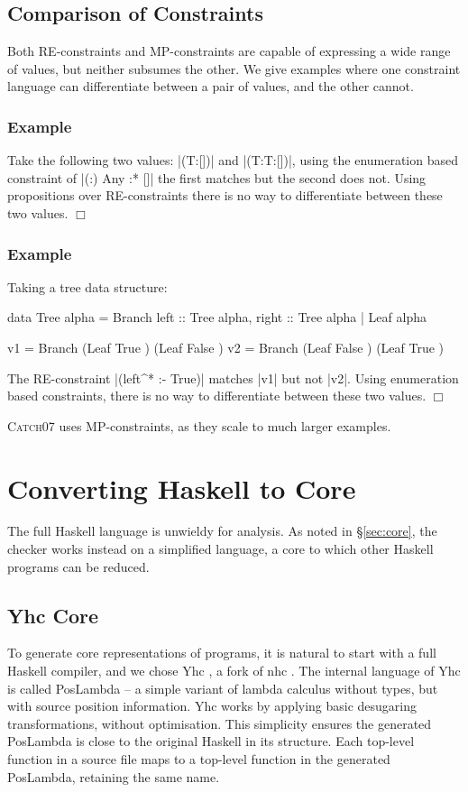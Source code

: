 \documentclass[preprint]{sigplanconf}
\newcommand{\catch}{\textsc{Catch}}
\newcounter{exmp}
\newcommand{\yesexample}{\subsubsection*{Example \arabic{exmp}}\addtocounter{exmp}{1}}
\newcommand{\noexample}{\hfill$\Box$}
\newenvironment{example}{\yesexample}{\noexample}
\begin{document}
\subsection{Comparison of Constraints}

Both RE-constraints and MP-constraints are capable of expressing a wide range of values, but neither subsumes the other. We give examples where one constraint language can differentiate between a pair of values, and the other cannot.

\begin{example}
Take the following two values: |(T:[])| and |(T:T:[])|, using the enumeration based constraint of |{(:) Any} :* {[]}| the first matches but the second does not. Using propositions over RE-constraints there is no way to differentiate between these two values.
\end{example}

\begin{example}
Taking a tree data structure:

\begin{code}
data Tree alpha  =  Branch {left :: Tree alpha, right :: Tree alpha}
                 |  Leaf alpha

v1 = Branch (Leaf True   ) (Leaf False  )
v2 = Branch (Leaf False  ) (Leaf True   )
\end{code}

The RE-constraint |(left^* :- True)| matches |v1| but not |v2|. Using enumeration based constraints, there is no way to differentiate between these two values.
\end{example}

\catch07 uses MP-constraints, as they scale to much larger examples.

\section{Converting Haskell to Core}
\label{sec:transform}

The full Haskell language is unwieldy for analysis. As noted in \S\ref{sec:core}, the checker works instead on a simplified language, a core to which other Haskell programs can be reduced.

\subsection{Yhc Core}

To generate core representations of programs, it is natural to start with a full Haskell compiler, and we chose Yhc \citep{Yhc}, a fork of nhc \citep{nhc}. The internal language of Yhc is called PosLambda -- a simple variant of lambda calculus without types, but with source position information. Yhc works by applying basic desugaring transformations, without optimisation. This simplicity ensures the generated PosLambda is close to the original Haskell in its structure. Each top-level function in a source file maps to a top-level function in the generated PosLambda, retaining the same name.
\end{document}
